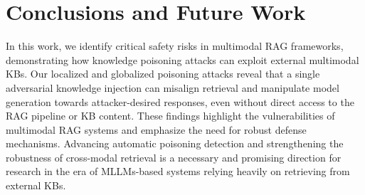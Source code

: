 \section{Conclusions and Future Work}

In this work, we identify critical safety risks in multimodal RAG frameworks, demonstrating how knowledge poisoning attacks can exploit external multimodal KBs. Our localized and globalized poisoning attacks reveal that a single adversarial knowledge injection can misalign retrieval and manipulate model generation towards attacker-desired responses, even without direct access to the RAG pipeline or KB content. These findings highlight the vulnerabilities of multimodal RAG systems and emphasize the need for robust defense mechanisms. 
Advancing automatic poisoning detection and strengthening the robustness of cross-modal retrieval is a necessary and promising direction for research in the era of MLLMs-based systems relying heavily on retrieving from external KBs.




